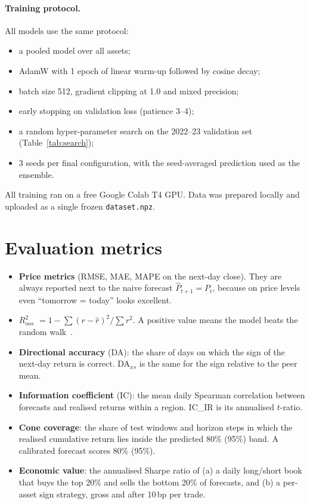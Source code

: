 \documentclass[11pt,a4paper]{article}
\begin{document}
\paragraph{Training protocol.} All models use the same protocol:
\begin{itemize}
  \item a pooled model over all \NAssets{} assets;
  \item AdamW with 1 epoch of linear warm-up followed by cosine decay;
  \item batch size 512, gradient clipping at 1.0 and mixed precision;
  \item early stopping on validation loss (patience 3--4);
  \item a random hyper-parameter search on the 2022--23 validation set (Table~\ref{tab:search});
  \item 3 seeds per final configuration, with the seed-averaged prediction used as the ensemble.
\end{itemize}
All training ran on a free Google Colab T4 GPU. Data was prepared locally and uploaded as a single frozen \texttt{dataset.npz}.

\section{Evaluation metrics}
\begin{itemize}
  \item \textbf{Price metrics} (RMSE, MAE, MAPE on the next-day close). They are always reported next to the naive forecast $\hat P_{t+1}=P_t$, because on price levels even ``tomorrow = today'' looks excellent.
  \item \textbf{$R^2_{oos}$} $=1-\sum(r-\hat r)^2/\sum r^2$. A positive value means the model beats the random walk~\cite{campbell2008}.
  \item \textbf{Directional accuracy} (DA): the share of days on which the sign of the next-day return is correct. DA$_{xs}$ is the same for the sign relative to the peer mean.
  \item \textbf{Information coefficient} (IC): the mean daily Spearman correlation between forecasts and realised returns within a region. IC\_IR is its annualised $t$-ratio.
  \item \textbf{Cone coverage}: the share of test windows and horizon steps in which the realised cumulative return lies inside the predicted 80\% (95\%) band. A calibrated forecast scores 80\% (95\%).
  \item \textbf{Economic value}: the annualised Sharpe ratio of (a) a daily long/short book that buys the top 20\% and sells the bottom 20\% of forecasts, and (b) a per-asset sign strategy, gross and after 10\,bp per trade.
\end{itemize}
\end{document}
